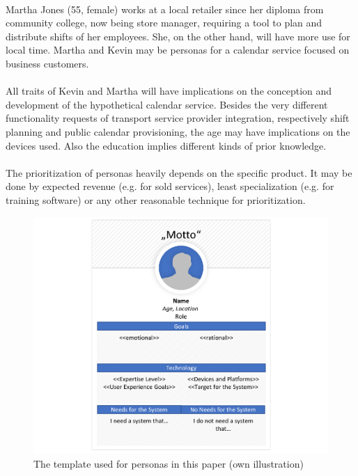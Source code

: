 \paragraph{} Martha Jones (55, female) works at a local retailer since her diploma from community college, now being store manager, requiring a tool to plan and distribute shifts of her employees. She, on the other hand, will have more use for local time. Martha and Kevin may be personas for a calendar service focused on business customers. 

\paragraph{} All traits of Kevin and Martha will have implications on the conception and development of the hypothetical calendar service. Besides the very different functionality requests of transport service provider integration, respectively shift planning and public calendar provisioning, the age may have implications on the devices used. Also the education implies different kinds of prior knowledge. 

\paragraph{} The prioritization of personas heavily depends on the specific product. It may be done by expected revenue (e.g. for sold services), least specialization (e.g. for training software) or any other reasonable technique for prioritization.

\begin{figure}[H]
    \centering
    \includegraphics[width=\textwidth]{img/PersonaTemplate.pdf}
    \caption[Template for Personas]{The template used for personas in this paper (own illustration)}
    \label{fig:persTemp}
\end{figure}


